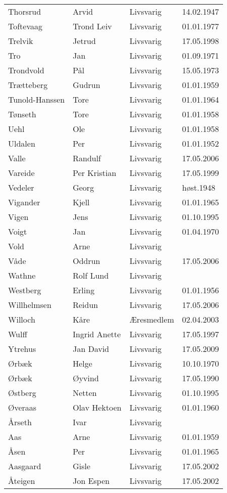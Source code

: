 \begin{longtable}{llll}
Thorsrud	&	Arvid	&	Livsvarig 	&	14.02.1947	\\
Toftevaag	&	Trond Leiv	&	Livsvarig 	&	01.01.1977	\\
Trelvik 	&	Jetrud	&	Livsvarig	&	17.05.1998	\\
Tro	&	Jan	&	Livsvarig 	&	01.09.1971	\\
Trondvold	&	Pål	&	Livsvarig 	&	15.05.1973	\\
Trætteberg	&	Gudrun	&	Livsvarig 	&	01.01.1959	\\
Tunold-Hanssen	&	Tore	&	Livsvarig 	&	01.01.1964	\\
Tønseth	&	Tore	&	Livsvarig 	&	01.01.1958	\\
Uehl	&	Ole	&	Livsvarig 	&	01.01.1958	\\
Uldalen	&	Per	&	Livsvarig 	&	01.01.1952	\\
Valle	&	Randulf	&	Livsvarig	&	17.05.2006	\\
Vareide 	&	Per Kristian	&	Livsvarig	&	17.05.1999	\\
Vedeler	&	Georg	&	Livsvarig	&	høst.1948	\\
Vigander	&	Kjell	&	Livsvarig 	&	01.01.1965	\\
Vigen 	&	Jens	&	Livsvarig	&	01.10.1995	\\
Voigt	&	Jan	&	Livsvarig 	&	01.04.1970	\\
Vold	&	Arne	&	Livsvarig 	&		\\
Våde	&	Oddrun	&	Livsvarig	&	17.05.2006	\\
Wathne	&	Rolf Lund	&	Livsvarig 	&		\\
Westberg	&	Erling	&	Livsvarig 	&	01.01.1956	\\
Willhelmsen	&	Reidun	&	Livsvarig	&	17.05.2006	\\
Willoch	&	Kåre	&	Æresmedlem	&	02.04.2003	\\
Wulff 	&	Ingrid Anette	&	Livsvarig	&	17.05.1997	\\
Ytrehus	&	Jan David	&	Livsvarig	&	17.05.2009	\\
Ørbæk	&	Helge	&	Livsvarig 	&	10.10.1970	\\
Ørbæk	&	Øyvind	&	Livsvarig 	&	17.05.1990	\\
Østberg 	&	Netten	&	Livsvarig	&	01.10.1995	\\
Øveraas	&	Olav Hektoen	&	Livsvarig 	&	01.01.1960	\\
Årseth	&	Ivar	&	Livsvarig 	&		\\
Aas	&	Arne	&	Livsvarig 	&	01.01.1959	\\
Åsen	&	Per	&	Livsvarig 	&	01.01.1965	\\
Aasgaard 	&	Gisle	&	Livsvarig	&	17.05.2002	\\
Åteigen 	&	Jon Espen	&	Livsvarig	&	17.05.2002	\\
    \end{longtable}

